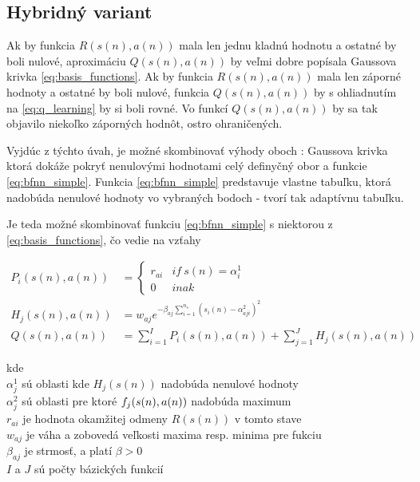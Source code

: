 \subsection{Hybridný variant}

Ak by funkcia $R(s(n), a(n))$ mala len jednu kladnú hodnotu a ostatné by boli
nulové, aproximáciu $Q(s(n), a(n))$ by veľmi dobre popísala Gaussova krivka \ref{eq:basis_functions}.
Ak by funkcia $R(s(n), a(n))$ mala len záporné hodnoty a ostatné by boli
nulové, funkcia $Q(s(n), a(n))$ by s ohliadnutím na \ref{eq:q_learning} by
si boli rovné. Vo funkcí $Q(s(n), a(n))$ by sa tak objavilo niekoľko záporných
hodnôt, ostro ohraničených.

Vyjdúc z týchto úvah, je možné skombinovať výhody oboch : Gaussova krivka
ktorá dokáže pokryť nenulovými hodnotami celý definyčný obor a funkcie \ref{eq:bfnn_simple}.
Funkcia \ref{eq:bfnn_simple} predstavuje vlastne tabuľku, ktorá nadobúda
nenulové hodnoty vo vybraných bodoch - tvorí tak adaptívnu tabuľku.

Je teda možné skombinovať funkciu \ref{eq:bfnn_simple} s niektorou z \ref{eq:basis_functions},
čo vedie na vzťahy

\begin{align}
P_i(s(n), a(n)) &=
\left\{
	\begin{array}{ll}
		r_{ai}  & if \ s(n) = \alpha^1_i \\
		0 & inak
	\end{array}
\right. \\
  H_j(s(n), a(n)) &= w_{aj} e^{ -\beta_{aj} \sum\limits_{i=1}^{n_s}{(s_i(n) - \alpha^2_{aji})^2 }} \\
  Q(s(n), a(n)) &= \sum\limits_{i=1}^{I} P_i(s(n),a(n)) + \sum\limits_{j=1}^{J} H_j(s(n), a(n))
  \label{eq:peak_hill}
\end{align}

kde \\
$\alpha^1_j$ sú oblasti kde $H_j(s(n))$ nadobúda nenulové hodnoty \\
$\alpha^2_j$ sú oblasti pre ktoré $f_j(\boldmath{s(n), a(n)})$ nadobúda maximum \\
$r_{ai}$ je hodnota okamžitej odmeny $R(s(n))$ v tomto stave \\
$w_{aj}$ je váha a zobovedá veľkosti maxima resp. minima pre fukciu \\
$\beta_{aj}$ je strmosť, a platí $\beta > 0$ \\
$I$ a $J$ sú počty bázických funkcií \\

